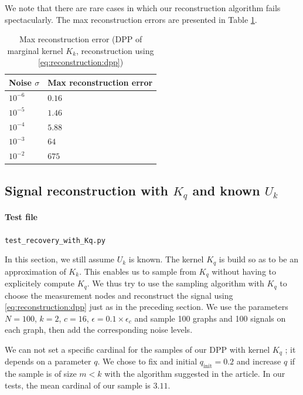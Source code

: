 \documentclass{article}
\begin{document}
We note that there are rare cases in which our reconstruction algorithm fails spectacularly. The max reconstruction errors are presented in Table \ref{tab:Kk:maxrecerror}. 


\begin{table}[ht]
  \caption{Max reconstruction error (DPP of marginal kernel $K_k$, reconstruction using \eqref{eq:reconstruction:dpp})}
  \label{tab:Kk:maxrecerror}
  \centering
  \begin{tabular}{ll}
    \toprule
    Noise $\sigma$ &  Max reconstruction error \\
    \midrule
    $10^{-6}$ & $0.16$ \\
    $10^{-5}$ & $1.46$ \\
    $10^{-4}$ & $5.88$ \\
		$10^{-3}$ & $64$ \\
		$10^{-2}$ & $675$ \\
    \bottomrule
  \end{tabular}
\end{table}




\subsection[Signal reconstruction with Kq and known Uk]{Signal reconstruction with $K_q$ and known $U_k$}


\paragraph{Test file} \verb#test_recovery_with_Kq.py#


In this section, we still assume $U_k$ is known. The kernel $K_q$ is build so as to be an approximation of $K_k$. This enables us to sample from $K_q$ without having to explicitely compute $K_q$. We thus try to use the sampling algorithm with $K_q$ to choose the measurement nodes and reconstruct the signal using \eqref{eq:reconstruction:dpp} just as in the preceding section. We use the parameters $N=100$, $k=2$, $c=16$, $\epsilon = 0.1 \times \epsilon_c$ and sample 100 graphs and 100 signals on each graph, then add the corresponding noise levels.


We can not set a specific cardinal for the samples of our DPP with kernel $K_q$ ; it depends on a parameter $q$. We chose to fix and initial $q_\text{init}=0.2$ and increase $q$ if the sample is of size $m < k$ with the algorithm suggested in the article. In our tests, the mean cardinal of our sample is $3.11$. 
\end{document}
